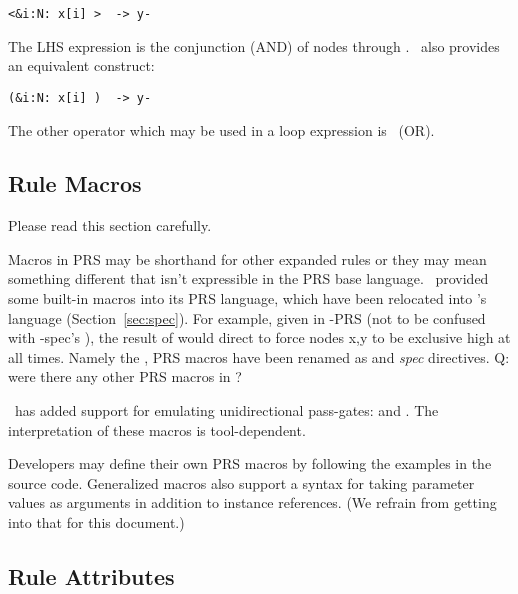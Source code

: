 \begin{verbatim}
<&i:N: x[i] >  -> y-
\end{verbatim}

The LHS expression is the conjunction (AND) of nodes 
 through .  
\hac\ also provides an equivalent construct:

\begin{verbatim}
(&i:N: x[i] )  -> y-
\end{verbatim}

The other operator which may be used in a loop expression is \prsor\ (OR).

\subsection{Rule Macros}
\label{sec:prs:macros}

Please read this section carefully.  

Macros in PRS may be shorthand for other expanded rules or 
they may mean something different that isn't expressible in
the PRS base language.  
\CAST\ provided some built-in macros into its PRS language, 
which have been relocated into \hac's
 language (Section~\ref{sec:spec}).  
For example, given  in \CAST-PRS 
(not to be confused with \CAST-spec's ), 
the result of  would direct  to 
force nodes {x,y} to be exclusive high at all times.  
Namely the ,  PRS macros have been
renamed as  and  \emph{spec} directives.  
Q: were there any other PRS macros in \CAST?

\hac\ has added support for emulating unidirectional pass-gates:
 and .
The interpretation of these macros is tool-dependent.  

Developers may define their own PRS macros by following the examples
in the source code.  
Generalized macros also support a syntax for taking parameter values
as arguments in addition to instance references.  
(We refrain from getting into that for this document.)

\subsection{Rule Attributes}
\label{sec:prs:ruleattrib}

